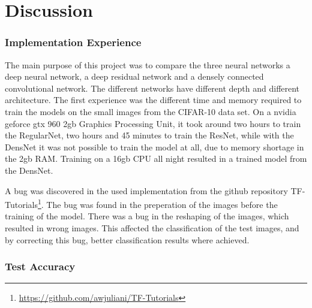 \chapter{Discussion}
\label{chp:discussion}

\subsection{Implementation Experience}

The main purpose of this project was to compare the three neural networks a deep neural network, a deep residual network and a densely connected convolutional network. The different networks have different depth and different architecture. The first experience was the different time and memory required to train the models on the small images from the CIFAR-10 data set. On a nvidia geforce gtx 960 2gb Graphics Processing Unit, it took around two hours to train the RegularNet, two hours and 45 minutes to train the ResNet, while with the DensNet it was not possible to train the model at all, due to memory shortage in the 2gb RAM. Training on a 16gb CPU all night resulted in a trained model from the DensNet.

A bug was discovered in the used implementation from the github repository TF-Tutorials\footnote{\url{https://github.com/awjuliani/TF-Tutorials}}. The bug was found in the preperation of the images before the training of the model. There was a bug in the reshaping of the images, which resulted in wrong images. This affected the classification of the test images, and by correcting this bug, better classification results where achieved.

\subsection{Test Accuracy}

\FloatBarrier

